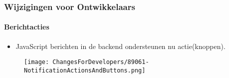 %
%
%
%
%
%
%


\begin{frame}[fragile]
	\frametitle{Wijzigingen voor Ontwikkelaars}
	\framesubtitle{Berichtacties}

	\begin{itemize}
		\item JavaScript berichten in de backend ondersteunen nu actie(knoppen).
	\end{itemize}

	\begin{figure}
		\texttt{[image: ChangesForDevelopers/89061-NotificationActionsAndButtons.png]}
	\end{figure}

\end{frame}


